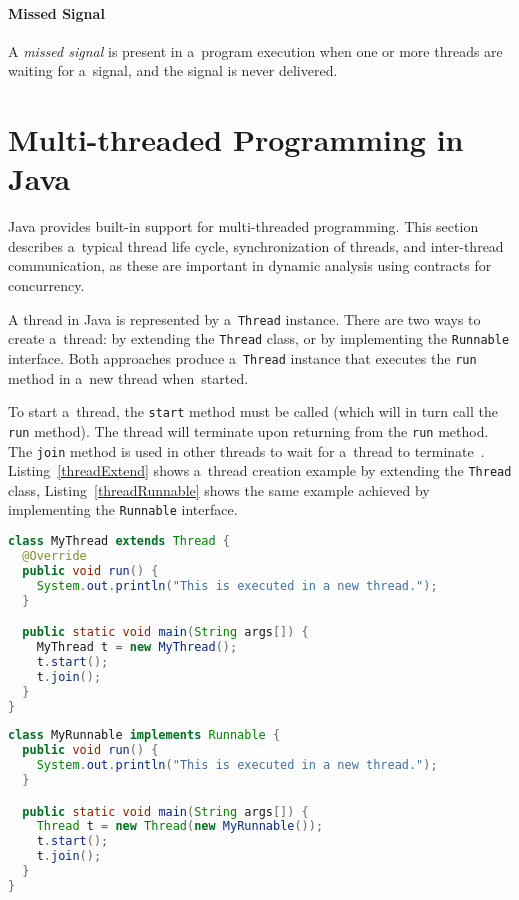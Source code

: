 \paragraph{Missed Signal}
A \emph{missed signal} is present in a~program execution when one or more
threads are waiting for a~signal, and the signal is never delivered.

\section{Multi-threaded Programming in Java}

Java provides built-in support for multi-threaded programming. This section
describes a~typical thread life cycle, synchronization of threads, and
inter-thread communication, as these are important in dynamic analysis using
contracts for concurrency.

A thread in Java is represented by a~\texttt{Thread} instance. There are two
ways to create a~thread: by extending the \texttt{Thread} class, or by
implementing the \texttt{Runnable} interface. Both approaches produce
a~\texttt{Thread} instance that executes the \texttt{run} method in a~new thread
when~started.

To start a~thread, the \texttt{start} method must be called (which will in
turn call the \texttt{run} method). The thread will terminate upon returning
from the \texttt{run} method. The \texttt{join} method is used in other
threads to wait for a~thread to terminate~\cite{javaTheCompleteReference}.
Listing~\ref{threadExtend} shows a~thread creation example by extending the
\texttt{Thread} class, Listing~\ref{threadRunnable} shows the same example
achieved by implementing the \texttt{Runnable} interface.

\begin{lstlisting}[language=java, caption={A simple program that creates
a~thread by extending the \texttt{Thread} class.}, float=hb, label=threadExtend]
class MyThread extends Thread {
  @Override
  public void run() {
    System.out.println("This is executed in a new thread.");
  }

  public static void main(String args[]) {
    MyThread t = new MyThread();
    t.start();
    t.join();
  }
}
\end{lstlisting}

\begin{lstlisting}[language=java, label=threadRunnable, float=ht, caption={A
simple program that creates a~thread by implementing the \texttt{Runnable}
interface.}]
class MyRunnable implements Runnable {
  public void run() {
    System.out.println("This is executed in a new thread.");
  }

  public static void main(String args[]) {
    Thread t = new Thread(new MyRunnable());
    t.start();
    t.join();
  }
}
\end{lstlisting}

